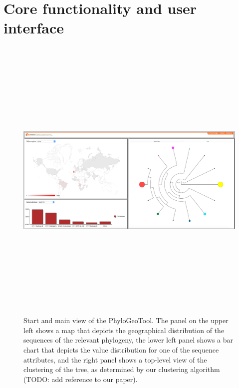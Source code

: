 \documentclass[a4paper, 11pt]{article} %
\begin{document}
\section{Core functionality and user interface}
\begin{figure}[H]
\centering
\includegraphics[width=400pt, height=400pt, keepaspectratio=true]{images/initial_view.PNG}
\caption{Start and main view of the PhyloGeoTool. The panel on the upper left shows a map that depicts the geographical distribution of the sequences of the relevant phylogeny, the lower left panel shows a bar chart that depicts the value distribution for one of the sequence attributes, and the right panel shows a top-level view of the clustering of the tree, as determined by our clustering algorithm (TODO: add reference to our paper).}
\label{fig:initial_view}
\end{figure}
\end{document}
